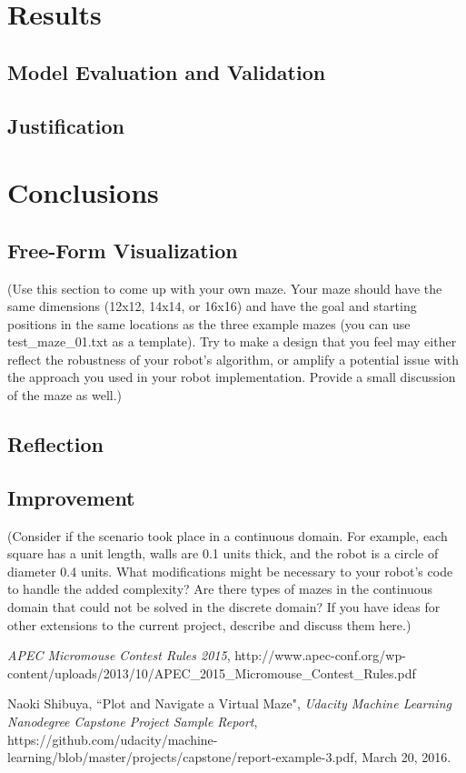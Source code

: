 \documentclass[11pt, oneside]{article}   	%
\begin{document}
\section{Results}
\subsection{Model Evaluation and Validation}
\subsection{Justification}


\section{Conclusions}
\subsection{Free-Form Visualization}
(Use this section to come up with your own maze. Your maze should have the same dimensions (12x12, 14x14, or 16x16) and have the goal and starting positions in the same locations as the three example mazes (you can use test\_maze\_01.txt as a template). Try to make a design that you feel may either reflect the robustness of your robot’s algorithm, or amplify a potential issue with the approach you used in your robot implementation. Provide a small discussion of the maze as well.)
\subsection{Reflection}
\subsection{Improvement}
(Consider if the scenario took place in a continuous domain. For example, each square has a unit length, walls are 0.1 units thick, and the robot is a circle of diameter 0.4 units. What modifications might be necessary to your robot’s code to handle the added complexity? Are there types of mazes in the continuous domain that could not be solved in the discrete domain? If you have ideas for other extensions to the current project, describe and discuss them here.)

\begin{thebibliography}{1}

   {\em APEC Micromouse Contest Rules 2015}, http://www.apec-conf.org/wp-content/uploads/2013/10/APEC\_2015\_Micromouse\_Contest\_Rules.pdf


   Naoki Shibuya, ``Plot and Navigate a Virtual Maze", {\em Udacity Machine Learning Nanodegree Capstone Project Sample Report}, https://github.com/udacity/machine-learning/blob/master/projects/capstone/report-example-3.pdf, March 20, 2016.

  \end{thebibliography}
\end{document}
